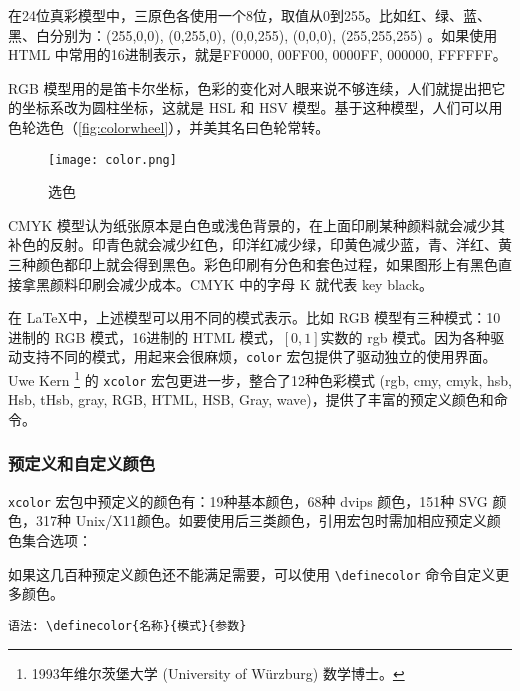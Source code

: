在24位真彩模型中，三原色各使用一个8位，取值从0到255。比如红、绿、蓝、黑、白分别为：(255,0,0), (0,255,0), (0,0,255), (0,0,0), (255,255,255) 。如果使用 HTML 中常用的16进制表示，就是FF0000, 00FF00, 0000FF, 000000, FFFFFF。

RGB 模型用的是笛卡尔坐标，色彩的变化对人眼来说不够连续，人们就提出把它的坐标系改为圆柱坐标，这就是 HSL 和 HSV 模型。基于这种模型，人们可以用色轮选色（\autoref{fig:colorwheel}），并美其名曰色轮常转。

\begin{figure}[htbp]
\centering
\texttt{[image: color.png]}
\caption{选色}
\label{fig:colorwheel}
\end{figure}

CMYK 模型认为纸张原本是白色或浅色背景的，在上面印刷某种颜料就会减少其补色的反射。印青色就会减少红色，印洋红减少绿，印黄色减少蓝，青、洋红、黄三种颜色都印上就会得到黑色。彩色印刷有分色和套色过程，如果图形上有黑色直接拿黑颜料印刷会减少成本。CMYK 中的字母 K 就代表 key black。

在 \LaTeX 中，上述模型可以用不同的模式表示。比如 RGB 模型有三种模式：10进制的 RGB 模式，16进制的 HTML 模式，$[0,1]$实数的 rgb 模式。因为各种驱动支持不同的模式，用起来会很麻烦，\texttt{color} 宏包提供了驱动独立的使用界面。Uwe Kern\indexKern{} \footnote{1993年维尔茨堡大学 (University of Würzburg) 数学博士。} 的 \texttt{xcolor} 宏包更进一步，整合了12种色彩模式 (rgb, cmy, cmyk, hsb, Hsb, tHsb, gray, RGB, HTML, HSB, Gray, wave)，提供了丰富的预定义颜色和命令。

\subsubsection{预定义和自定义颜色}

\texttt{xcolor} 宏包中预定义的颜色有：19种基本颜色，68种 dvips 颜色，151种 SVG 颜色，317种 Unix/X11颜色。如要使用后三类颜色，引用宏包时需加相应预定义颜色集合选项：

\begin{Code}[]
\usepackage[dvipsnames]{xcolor}
\usepackage[svgnames]{xcolor}
\usepackage[x11names]{xcolor}
\end{Code}

如果这几百种预定义颜色还不能满足需要，可以使用 \verb|\definecolor| 命令自定义更多颜色。

\verb|语法: \definecolor{名称}{模式}{参数}|

\begin{example}[h]
\begin{Code}[]
\end{Code}
\caption{自定义颜色}
\label{exa:definecolor}
\end{example}

